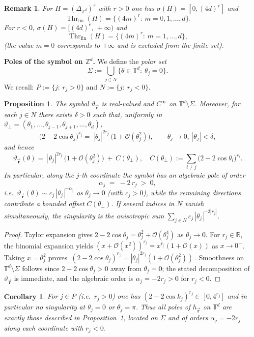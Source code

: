 \documentclass[10pt]{amsart} %
\newcommand{\Z}{{\mathbb{Z}}}
\newcommand{\1}{{\mathbb{I}}}
\newcommand{\Thr}{\operatorname{Thr}}
\numberwithin{equation}{section}
\newtheorem{proposition}[theorem]{Proposition}%
\newtheorem{remark}[theorem]{Remark}%
\newtheorem{corollary}[theorem]{Corollary}%
\begin{document}
\begin{remark}
For $H=(\Delta_{\Z^d})^{r}$ with $r>0$ one has $\sigma(H)=[0,(4d)^r]$ and
\[
\Thr_{\mathrm{fin}}(H)=\{(4m)^r:\ m=0,1,\dots,d\}.
\]
For $r<0$, $\sigma(H)=[(4d)^r,\,+\infty)$ and
\[
\Thr_{\mathrm{fin}}(H)=\{(4m)^r:\ m=1,\dots,d\},
\]
(the value $m=0$ corresponds to $+\infty$ and is excluded from the finite set).
\end{remark}
\noindent\textbf{Poles of the symbol on $\mathbb{Z}^d$.} We define the \emph{polar set}
\[
\Sigma:=\bigcup_{j\in N}\{\theta\in\mathbb{T}^d:\ \theta_j=0\}.
\]
We recall: $P:=\{j:\ r_j>0\}$ and $N:=\{j:\ r_j<0\}$.
\begin{proposition}\label{prop:poles-Zd}
The symbol $\vartheta_{\vec{\mathbf{r}}}$ is real-valued and $C^\infty$ on $\mathbb{T}^d\setminus\Sigma$.
Moreover, for each $j\in N$ there exists $\delta>0$ such that, uniformly in $\vartheta_\perp=(\theta_1,\dots,\theta_{j-1},\theta_{j+1},\dots,\theta_d)$,
\[
\bigl(2-2\cos \theta_j\bigr)^{r_j}
=\ |\theta_j|^{2r_j}\,\bigl(1+\mathcal{O}(\theta_j^2)\bigr),
\qquad \theta_j\to0,\ |\theta_j|<\delta,
\]
and hence
\[
\vartheta_{\vec{\mathbf{r}}}(\theta)
=\ |\theta_j|^{2r_j}\,\bigl(1+\mathcal{O}(\theta_j^2)\bigr)\ +\ C(\theta_\perp),
\quad C(\theta_\perp):=\sum_{i\neq j}\bigl(2-2\cos \theta_i\bigr)^{r_i}.
\]
In particular, along the $j$-th coordinate the symbol has an algebraic pole of order
\[
\alpha_j\;=\;-2\,r_j\;>\;0,
\]
i.e.\ $\vartheta_{\vec{\mathbf{r}}}(\theta)\sim c_j\,|\theta_j|^{-\alpha_j}$ as $\theta_j\to0$ (with $c_j>0$), while the remaining directions contribute a bounded offset $C(\theta_\perp)$.
If several indices in $N$ vanish simultaneously, the singularity is the \emph{anisotropic sum}
$\sum_{j\in N} c_j\,|\theta_j|^{-2|r_j|}$.
\end{proposition}

\begin{proof}
Taylor expansion gives $2-2\cos \theta_j=\theta_j^2+\mathcal{O}(\theta_j^4)$ as $\theta_j\to0$.
For $r_j\in\mathbb{R}$, the binomial expansion yields
$(x+\mathcal{O}(x^2))^{r_j}=x^{r_j}(1+\mathcal{O}(x))$ as $x\to0^+$. Taking $x=\theta_j^2$ proves
\(\ (2-2\cos \theta_j)^{r_j}=|\theta_j|^{2r_j}(1+\mathcal{O}(\theta_j^2))\ \).
Smoothness on $\mathbb{T}^d\setminus\Sigma$ follows since $2-2\cos \theta_j>0$ away from $\theta_j=0$; the stated decomposition of $\vartheta_{\vec{\mathbf{r}}}$ is immediate, and the algebraic order is $\alpha_j=-2r_j>0$ for $r_j<0$.
\end{proof}

\begin{corollary}
For $j\in P$ (i.e.\ $r_j>0$) one has $(2-2\cos k_j)^{r_j}\in[0,4^{r_j}]$ and in particular no singularity at $\theta_j=0$ or $\theta_j=\pi$.
Thus all poles of $h_{\vec{\mathbf{r}}}$ on $\mathbb{T}^d$ are exactly those described in Proposition~\ref{prop:poles-Zd}, located on $\Sigma$ and of orders $\alpha_j=-2r_j$ along each coordinate with $r_j<0$.
\end{corollary}
\end{document}
